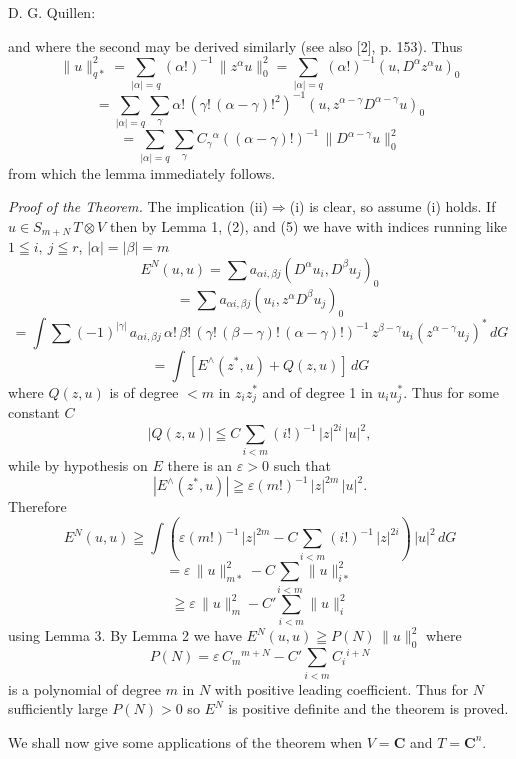  D. G. Quillen:

and where the second may be derived similarly (see also [2], p. 153). Thus
\[ \|u\|^2_{q*} = \sum_{|\alpha|=q} (\alpha!)^{-1}\, \|z^\alpha u\|^2_0 = \sum_{|\alpha|=q} (\alpha!)^{-1} (u, D^\alpha z^\alpha u)_0 \]
\[ = \sum_{|\alpha|=q} \sum_{\gamma} \alpha!\,(\gamma!\,(\alpha-\gamma)!^2)^{-1} (u, z^{\alpha-\gamma} D^{\alpha-\gamma} u)_0 \]
\[ = \sum_{|\alpha|=q} \sum_{\gamma} C_\gamma{}^\alpha ((\alpha-\gamma)!)^{-1}\, \|D^{\alpha-\gamma} u\|^2_0 \]
from which the lemma immediately follows.

\emph{Proof of the Theorem.} The implication (ii)$\Rightarrow$(i) is clear, so assume (i)
holds. If $u \in S_{m+N}\, T \otimes V$ then by Lemma 1, (2), and (5) we have with
indices running like $1 \leqq i,\ j \leqq r$, $|\alpha| = |\beta| = m$
\[ E^N(u,u) = \sum a_{\alpha i, \beta j} (D^\alpha u_i, D^\beta u_j)_0 \]
\[ = \sum a_{\alpha i, \beta j} (u_i, z^\alpha D^\beta u_j)_0 \]
\[ = \int \sum (-1)^{|\gamma|}\, a_{\alpha i, \beta j}\, \alpha!\, \beta!\, (\gamma!\, (\beta-\gamma)!\, (\alpha-\gamma)!)^{-1}\, z^{\beta-\gamma} u_i (z^{\alpha-\gamma} u_j)^*\, dG \]
\[ = \int [E^\wedge (z^*, u) + Q(z,u)]\, dG \]
where $Q(z,u)$ is of degree $<m$ in $z_i z_j^*$ and of degree 1 in $u_i u_j^*$. Thus
for some constant $C$
\[ |Q(z,u)| \leqq C \sum_{i<m} (i!)^{-1}\, |z|^{2i}\, |u|^2, \]
while by hypothesis on $E$ there is an $\varepsilon > 0$ such that
\[ |E^\wedge (z^*, u)| \geqq \varepsilon (m!)^{-1}\, |z|^{2m}\, |u|^2. \]
Therefore
\[ E^N(u,u) \geqq \int (\varepsilon (m!)^{-1}\, |z|^{2m} - C \sum_{i<m} (i!)^{-1}\, |z|^{2i})\, |u|^2\, dG \]
\[ = \varepsilon\, \|u\|^2_{m*} - C \sum_{i<m} \|u\|^2_{i*} \]
\[ \geqq \varepsilon\, \|u\|^2_m - C' \sum_{i<m} \|u\|^2_i \]
using Lemma 3. By Lemma 2 we have $E^N(u,u) \geqq P(N)\, \|u\|^2_0$ where
\[ P(N) = \varepsilon\, C_m{}^{m+N} - C' \sum_{i<m} C_i{}^{i+N} \]
is a polynomial of degree $m$ in $N$ with positive leading coefficient. Thus
for $N$ sufficiently large $P(N) > 0$ so $E^N$ is positive definite and the theorem
is proved.

We shall now give some applications of the theorem when $V = \mathbf{C}$
and $T = \mathbf{C}^n$.

